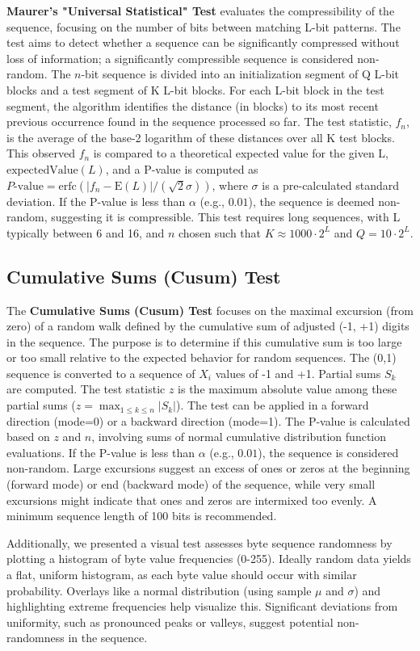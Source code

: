 \textbf{Maurer's "Universal Statistical" Test} evaluates the compressibility of the sequence, focusing on the number of bits between matching L-bit patterns. The test aims to detect whether a sequence can be significantly compressed without loss of information; a significantly compressible sequence is considered non-random. The $n$-bit sequence is divided into an initialization segment of Q L-bit blocks and a test segment of K L-bit blocks. For each L-bit block in the test segment, the algorithm identifies the distance (in blocks) to its most recent previous occurrence found in the sequence processed so far. The test statistic, $f_n$, is the average of the base-2 logarithm of these distances over all K test blocks. This observed $f_n$ is compared to a theoretical expected value for the given L, $\text{expectedValue}(L)$, and a P-value is computed as $P\text{-value} = \text{erfc}(|f_n - \text{E}(L)| / (\sqrt{2}\sigma))$, where $\sigma$ is a pre-calculated standard deviation. If the P-value is less than $\alpha$ (e.g., $0.01$), the sequence is deemed non-random, suggesting it is compressible. This test requires long sequences, with L typically between 6 and 16, and $n$ chosen such that $K \approx 1000 \cdot 2^L$ and $Q = 10 \cdot 2^L$.

\subsection{\textbf{Cumulative Sums (Cusum) Test}}

The \textbf{Cumulative Sums (Cusum) Test} focuses on the maximal excursion (from zero) of a random walk defined by the cumulative sum of adjusted (-1, +1) digits in the sequence. The purpose is to determine if this cumulative sum is too large or too small relative to the expected behavior for random sequences. The (0,1) sequence is converted to a sequence of $X_i$ values of -1 and +1. Partial sums $S_k$ are computed. The test statistic $z$ is the maximum absolute value among these partial sums ($z = \max_{1 \le k \le n} |S_k|$). The test can be applied in a forward direction (mode=0) or a backward direction (mode=1). The P-value is calculated based on $z$ and $n$, involving sums of normal cumulative distribution function evaluations. If the P-value is less than $\alpha$ (e.g., $0.01$), the sequence is considered non-random. Large excursions suggest an excess of ones or zeros at the beginning (forward mode) or end (backward mode) of the sequence, while very small excursions might indicate that ones and zeros are intermixed too evenly. A minimum sequence length of 100 bits is recommended.

Additionally, we presented a visual test assesses byte sequence randomness by plotting a histogram of byte value frequencies (0-255). Ideally random data yields a flat, uniform histogram, as each byte value should occur with similar probability. Overlays like a normal distribution (using sample $\mu$ and $\sigma$) and highlighting extreme frequencies help visualize this. Significant deviations from uniformity, such as pronounced peaks or valleys, suggest potential non-randomness in the sequence.